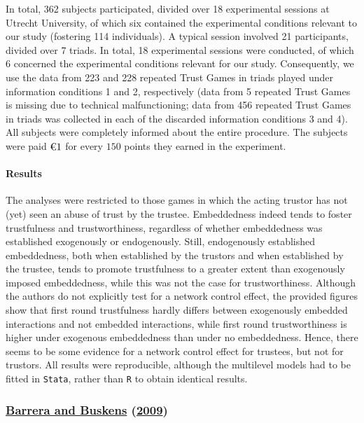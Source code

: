 \documentclass[
  11pt,
]{article}
\begin{document}
In total, 362 subjects participated, divided over 18 experimental sessions at Utrecht University, of which six contained the experimental conditions relevant to our study (fostering 114 individuals). A typical session involved 21 participants, divided over 7 triads. In total, 18 experimental sessions were conducted, of which 6 concerned the experimental conditions relevant for our study.
Consequently, we use the data from 223 and 228 repeated Trust Games in triads played under information conditions 1 and 2, respectively (data from 5 repeated Trust Games is missing due to technical malfunctioning; data from 456 repeated Trust Games in triads was collected in each of the discarded information conditions 3 and 4). All subjects were completely informed about the entire procedure. The subjects were paid \(\text{\texteuro}1\) for every \(150\) points they earned in the experiment.

\hypertarget{results-7}{%
\paragraph{Results}\label{results-7}}

The analyses were restricted to those games in which the acting trustor has not (yet) seen an abuse of trust by the trustee. Embeddedness indeed tends to foster trustfulness and trustworthiness, regardless of whether embeddedness was established exogenously or endogenously. Still, endogenously established embeddedness, both when established by the trustors and when established by the trustee, tends to promote trustfulness to a greater extent than exogenously imposed embeddedness, while this was not the case for trustworthiness. Although the authors do not explicitly test for a network control effect, the provided figures show that first round trustfulness hardly differs between exogenously embedded interactions and not embedded interactions, while first round trustworthiness is higher under exogenous embeddedness than under no embeddedness. Hence, there seems to be some evidence for a network control effect for trustees, but not for trustors.
All results were reproducible, although the multilevel models had to be fitted in \texttt{Stata}, rather than \texttt{R} to obtain identical results.

\hypertarget{barrera_buskens_third_2009}{%
\subsubsection{\texorpdfstring{\protect\hyperlink{ref-barrera_buskens_third_2009}{Barrera and Buskens} (\protect\hyperlink{ref-barrera_buskens_third_2009}{2009})}{Barrera and Buskens (2009)}}\label{barrera_buskens_third_2009}}
\end{document}
